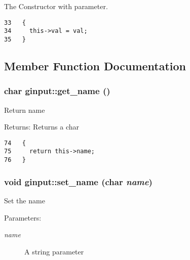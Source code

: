 The Constructor with parameter. 

\begin{Code}\begin{verbatim}33   {
34     this->val = val;
35   }
\end{verbatim}\end{Code}




\subsection{Member Function Documentation}
\subsubsection{\setlength{\rightskip}{0pt plus 5cm}char ginput::get\_\-name ()\hspace{0.3cm}{\tt  [inline]}}\label{classginput_598509c3ec74101e29e4017bd6670595}


Return name

\begin{Desc}
\item[Returns:]Returns a char \end{Desc}


\begin{Code}\begin{verbatim}74   {
75     return this->name;
76   }
\end{verbatim}\end{Code}


\subsubsection{\setlength{\rightskip}{0pt plus 5cm}void ginput::set\_\-name (char {\em name})\hspace{0.3cm}{\tt  [inline]}}\label{classginput_f0422ac4010737b0e8c27c5853aef10b}


Set the name

\begin{Desc}
\item[Parameters:]
\begin{description}
\item[{\em name}]A string parameter \end{description}
\end{Desc}



